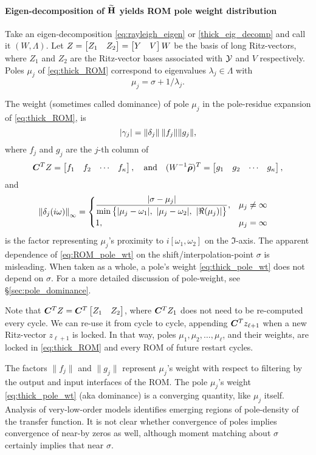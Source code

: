 \paragraph{Eigen-decomposition of $\widetilde{\textbf{\textup{H}}}$ yields ROM pole weight distribution}
Take an eigen-decomposition \eqref{eq:rayleigh_eigen}  or  \eqref{thick_eig_decomp} and call it  $(W,\Lambda)$.  Let $Z = \begin{bmatrix} Z_1 & Z_2\end{bmatrix} =\begin{bmatrix} Y&V\end{bmatrix} W$ be the basis of long Ritz-vectors, where $Z_1$ and $Z_2$ are the Ritz-vector bases associated with $\mathcal{Y}$ and $V$ respectively.    Poles $\mu_j$ of \eqref{eq:thick_ROM} correspond to eigenvalues $\lambda_j \in \Lambda$ with  
\[
\mu_j=\sigma+1/\lambda_j.
\]  

The weight (sometimes called dominance) of pole $\mu_j$ in the pole-residue expansion of \eqref{eq:thick_ROM}, is   
\begin{equation}
|\gamma_j| =  \left\| \delta_j \right\|_{} \|f_j\|\|g_j\|,
\label{eq:thick_pole_wt}
\end{equation}
where $f_j$ and $g_j$ are the $j$-th column of 
\[
\bm{C}^T Z = \begin{bmatrix} f_1 & f_2 &\cdots&f_{\kappa}\end{bmatrix}, \quad\text{and}\quad
(W^{-1}\widetilde{\boldsymbol{\rho}})^T = \begin{bmatrix} g_1 & g_2 &\cdots&g_{\kappa}\end{bmatrix},
\]
and
\begin{align}
\left\| \delta_j(i\omega) \right\|_{\infty}&= \begin{cases}
\dfrac{| \sigma-\mu_j|}{\min\big\{|\mu_j-\omega_1|,\  |\mu_j -\omega_2|,\  |\Re(\mu_j)|  \big\}},   & \mu_j \neq \infty\\
1, & \mu_j = \infty
\end{cases}
\label{eq:ROM_pole_wt}
\end{align}
is the factor representing $\mu_j$'s proximity to $i[\omega_1,\omega_2]$ on the $\Im$-axis.
 The apparent dependence of \eqref{eq:ROM_pole_wt} on the shift/interpolation-point $\sigma$ is misleading.  When taken as a whole, a pole's weight \eqref{eq:thick_pole_wt} does not depend on $\sigma$.    For a more detailed discussion of pole-weight, see \S\ref{sec:pole_dominance}.


 

Note that $\bm{C}^T Z  = \bm{C}^T \begin{bmatrix} Z_1 & Z_2\end{bmatrix}$, where $\bm{C}^T Z_1$ does not need to be re-computed every cycle.  We can re-use it from cycle to cycle, appending $\bm{C}^T z_{\ell+1}$ when a new Ritz-vector $z_{\ell+1}$ is locked.  In that way, poles $\mu_1,\mu_2,\ldots,\mu_\ell$, and their weights, are locked in  \eqref{eq:thick_ROM} and every ROM of future restart cycles. 

   The factors $\|f_j\|$ and $\|g_j\|$   represent $\mu_j$'s weight with respect to filtering by the output and input interfaces of the ROM.  The pole $\mu_j$'s weight \eqref{eq:thick_pole_wt} (aka dominance) is a converging quantity,  like $\mu_j$ itself.  Analysis of very-low-order models identifies emerging regions of pole-density of the transfer function.  It is not clear whether convergence of poles implies convergence of near-by zeros as well, although moment matching about $\sigma$ certainly implies that near $\sigma$.  


